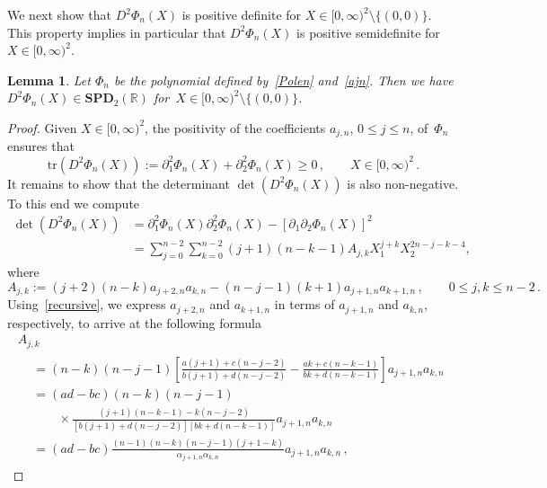 \documentclass[10pt]{amsart}
\newtheorem{lemm}[theo]{Lemma}\newtheorem{prop}[theo]{Proposition}\newtheorem{coro}[theo]{Corollary}\newtheorem{conj}[theo]{Conjecture}
\theoremstyle{definition}\newtheorem{defi}[theo]{Definition}\newtheorem{rema}[theo]{Remark}\newtheorem{exam}[theo]{Example}\newtheorem{exem}[theo]{Example}\newtheorem{nota}[theo]{Notation}
\newcommand{\bbR}{\mathbb{R}}
\newcommand{\bSPD}{\mathbf{SPD}}
\newcommand{\trr}{\mathrm{tr}}
\begin{document}
We next show that ${D^2\Phi_n(X)}$ is positive definite for $X\in[0,\infty)^2\setminus\{(0,0)\}$. This property implies in particular that ${D^2\Phi_n(X)}$ is positive semidefinite for $X\in[0,\infty)^2$.


\begin{lemm}\label{lem.p2}
Let $\Phi_n$ be the polynomial defined by~\eqref{Polen} and~\eqref{ajn}. Then we have~$D^2\Phi_n(X)\in \bSPD_2(\bbR)$ for~${X\in [0,\infty)^2\setminus\{(0,0)\}}$.
\end{lemm}


\begin{proof}
Given $X\in [0,\infty)^2$, the positivity of the coefficients $a_{j,n}$, $0\leq j\leq n$, of~$\Phi_n$ ensures that
\begin{equation*}
\trr(D^2\Phi_n(X)) := \partial_1^2 \Phi_n(X) + \partial_2^2 \Phi_n(X) \ge 0\,, \qquad X\in [0,\infty)^2\,.
\end{equation*}
It remains to show that the determinant $\det(D^2\Phi_n(X))$ is also non-negative. To this end we compute
\begin{equation}\label{lf07}
\begin{split}
\det(D^2\Phi_n(X)) & = \partial_1^2 \Phi_n(X) \partial_2^2 \Phi_n(X) - [\partial_1 \partial_2 \Phi_n(X)]^2 \\
& = \sum_{j=0}^{n-2} \sum_{k=0}^{n-2} (j+1)(n-k-1) A_{j,k} X_1^{j+k} X_2^{2n-j-k-4}, 
\end{split}
\end{equation}
where
\begin{equation*}
A_{j,k} := (j+2)(n-k) a_{j+2,n} a_{k,n} - (n-j-1)(k+1) a_{j+1,n} a_{k+1,n}\,, \qquad 0 \le j,k \le n-2\,.
\end{equation*}
Using~\eqref{recursive}, we express $a_{j+2,n}$ and $a_{k+1,n}$ in terms of $a_{j+1,n}$ and $a_{k,n}$, respectively, to arrive at the following formula
\begin{multline}\label{Ajk}
A_{j,k}\\
\begin{aligned}
&= (n-k)(n-j-1) \left[\frac{a(j+1)+c(n-j-2)}{b(j+1)+d(n-j-2)} - \frac{ak+c(n-k-1)}{bk+d(n-k-1)}\right] a_{j+1,n} a_{k,n}\\[1ex]
&= (ad-bc)(n-k)(n-j-1) \\[1ex] &\qquad\times\frac{(j+1)(n-k-1)-k(n-j-2)}{\left[b(j+1)+d(n-j-2)\right] \left[bk+d(n-k-1)\right]} a_{j+1,n} a_{k,n} \\[1ex]
&= (ad-bc)\frac{(n-1)(n-k)(n-j-1)(j+1-k)}{\alpha_{j+1,n}\alpha_{k,n}} a_{j+1,n} a_{k,n}\,,
\end{aligned}

\end{multline}
\end{proof}
\end{document}
